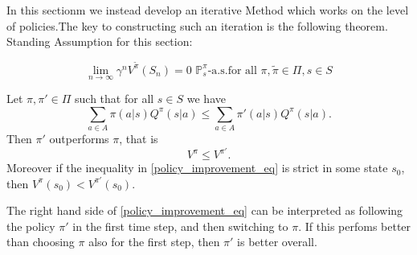 In this sectionm we instead develop an iterative Method which works on the level of policies.The key to constructing such an iteration is the following theorem.
Standing Assumption for this section:

\[
    \lim_{n \to \infty} \gamma^n V^{\widetilde{\pi}}(S_n) = 0 \,\, \mathbb{P}_s^\pi \text{-a.s.} \text{for all } \pi, \widetilde{\pi} \in \Pi, s \in S
\]


\begin{theorem}\label{policy_improvement}
    Let \( \pi, \pi' \in \Pi \) such that for all \( s \in S \) we have
    \begin{equation}
        \sum_{a \in A} \pi(a|s) Q^\pi(s|a) \leq \sum_{a \in A} \pi'(a|s) Q^\pi(s|a). \tag{\textasteriskcentered}\label{policy_improvement_eq}
    \end{equation}
    Then \( \pi' \) outperforms \( \pi \), that is 
    \[
        V^\pi \leq V^{\pi'}.
    \]
    Moreover if the inequality in \eqref{policy_improvement_eq} is strict in some state \( s_{0} \), then \( V^\pi(s_{0}) < V^{\pi'}(s_{0}) \).
\end{theorem}

\begin{remark}
The right hand side of \eqref{policy_improvement_eq} can be interpreted as following the policy \( \pi' \) in the first time step, and then switching to \( \pi \). If this perfoms better than choosing \( \pi \) also for the first step, then \( \pi' \) is better overall.     
\end{remark}


